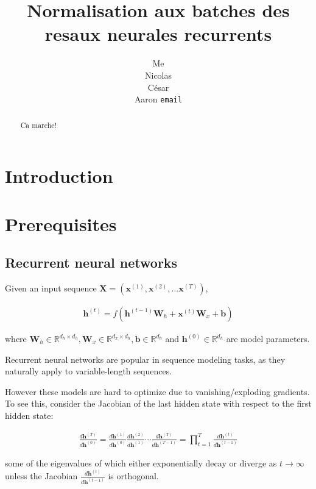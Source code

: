 \documentclass{article} %
\title{Normalisation aux batches des resaux neurales recurrents}
\author{
Me \\
\And
Nicolas \\
\And
C\'esar \\
\And
Aaron
\texttt{email} \\
}
\newcommand{\vect}[1]{\mathbf{#1}}
\newcommand{\mat}[1]{\mathbf{#1}}
\newcommand{\reals}{\mathbb{R}}
\begin{document}
\maketitle

\begin{abstract}
\,Ca marche!
\end{abstract}

\section{Introduction}

\section{Prerequisites}
\subsection{Recurrent neural networks}

Given an input sequence $\mat{X} = ( \vect{x}^{(1)}, \vect{x}^{(2)}, ... \vect{x}^{(T)} )$,

\begin{align}
\vect{h}^{(t)} = f(
  \vect{h}^{(t-1)} \mat{W}_h +
  \vect{x}^{(t  )} \mat{W}_x +
  \vect{b})
\end{align}

where $\mat{W}_h \in \reals^{d_h \times d_h},
       \mat{W}_x \in \reals^{d_x \times d_h},
       \vect{b} \in \reals^{d_h}$
  and $\vect{h}^{(0)} \in \reals^{d_h}$
  are model parameters.

Recurrent neural networks are popular in sequence modeling tasks, as they naturally apply to variable-length sequences.

However these models are hard to optimize due to vanishing/exploding gradients.
To see this, consider the Jacobian of the last hidden state with respect to the first hidden state:

\begin{align}
\frac{d \vect{h}^{(T)}}
     {d \vect{h}^{(0)}}
 =
\frac{d \vect{h}^{(1)}}
     {d \vect{h}^{(0)}}
\frac{d \vect{h}^{(2)}}
     {d \vect{h}^{(1)}}
\cdots
\frac{d \vect{h}^{(T)}}
     {d \vect{h}^{(T - 1)}}
 =
\prod_{t = 1}^{T}
\frac{d \vect{h}^{(t)}}
     {d \vect{h}^{(t - 1)}}
\end{align}

some of the eigenvalues of which either exponentially decay or diverge as $t \to \infty$ unless the Jacobian
$\frac{d \vect{h}^{(t)}}
      {d \vect{h}^{(t - 1)}}$
is orthogonal.
\end{document}
